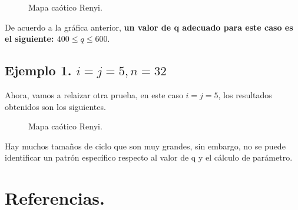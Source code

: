 \documentclass[12pt,3p]{elsarticle}
\begin{document}
\begin{figure}[H]
\centering
{}
\caption{Mapa caótico Renyi.} \label{Param}
\end{figure}

De acuerdo a la gráfica anterior, \textbf{un valor de q adecuado para este caso es el siguiente: $400 \leq q \leq 600$}.


\subsection{Ejemplo 1. $i=j=5, n=32$}

Ahora, vamos a  relaizar otra prueba, en este caso $i=j=5$, los resultados obtenidos son los siguientes. 


\begin{figure}[H]
\centering
{}
\caption{Mapa caótico Renyi.} \label{Param}
\end{figure}

Hay muchos tamaños de ciclo que son muy grandes, sin embargo, no se puede identificar un patrón específico respecto al valor de q y el cálculo de parámetro.




\section{Referencias.}




\end{document}
